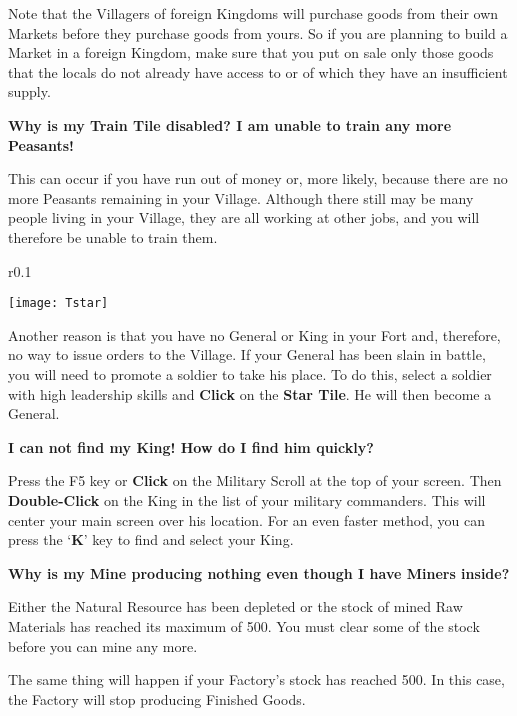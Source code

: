 Note that the Villagers of foreign Kingdoms will purchase goods from their own Markets before they purchase goods from yours. So if you are planning to build a Market in a foreign Kingdom, make sure that you put on sale only those goods that the locals do not already have access to or of which they have an insufficient supply.

{\large \textbf{\textsf{Why is my Train Tile disabled? I am unable to train any more Peasants!}}}

This can occur if you have run out of money or, more likely, because there are no more Peasants remaining in your Village. Although there still may be many people living in your Village, they are all working at other jobs, and you will therefore be unable to train them.

\begin{wrapfigure}{r}{0.1\textwidth}
    \vspace{-20pt}
    \begin{center}
        \texttt{[image: Tstar]}
    \end{center}
    \vspace{-20pt}
\end{wrapfigure}

Another reason is that you have no General or King in your Fort and, therefore, no way to issue orders to the Village. If your General has been slain in battle, you will need to promote a soldier to take his place. To do this, select a soldier with high leadership skills and \textbf{Click} on the \textbf{Star Tile}. He will then become a General.

{\large \textbf{\textsf{I can not find my King! How do I find him quickly?}}}

Press the F5 key or \textbf{Click} on the Military Scroll at the top of your screen. Then \textbf{Double-Click} on the King in the list of your military commanders. This will center your main screen over his location. For an even faster method, you can press the ‘\textbf{K}’ key to find and select your King.

{\large \textbf{\textsf{Why is my Mine producing nothing even though I have Miners inside?}}}

Either the Natural Resource has been depleted or the stock of mined Raw Materials has reached its maximum of 500. You must clear some of the stock before you can mine any more.

The same thing will happen if your Factory’s stock has reached 500. In this case, the Factory will stop producing Finished Goods.

